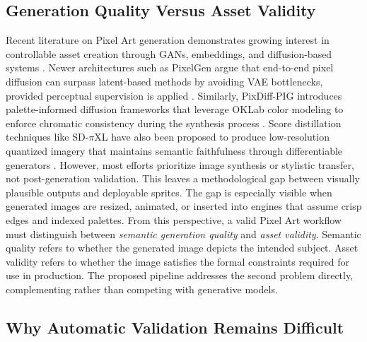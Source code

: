 \documentclass[runningheads]{llncs}
\begin{document}
\subsection{Generation Quality Versus Asset Validity}

Recent literature on Pixel Art generation demonstrates growing interest in controllable asset creation through GANs, embeddings, and diffusion-based systems \cite{coutinho2022,coutinho2024pixel,kim2023game,merino2023five,saravanan2022}. Newer architectures such as PixelGen argue that end-to-end pixel diffusion can surpass latent-based methods by avoiding VAE bottlenecks, provided perceptual supervision is applied \cite{ma2026pixelgen}. Similarly, PixDiff-PIG introduces palette-informed diffusion frameworks that leverage OKLab color modeling to enforce chromatic consistency during the synthesis process \cite{li2025pixdiff}. Score distillation techniques like SD-$\pi$XL have also been proposed to produce low-resolution quantized imagery that maintains semantic faithfulness through differentiable generators \cite{binninger2024sdpixl}. However, most efforts prioritize image synthesis or stylistic transfer, not post-generation validation. This leaves a methodological gap between visually plausible outputs and deployable sprites. The gap is especially visible when generated images are resized, animated, or inserted into engines that assume crisp edges and indexed palettes. From this perspective, a valid Pixel Art workflow must distinguish between \emph{semantic generation quality} and \emph{asset validity}. Semantic quality refers to whether the generated image depicts the intended subject. Asset validity refers to whether the image satisfies the formal constraints required for use in production. The proposed pipeline addresses the second problem directly, complementing rather than competing with generative models.

\subsection{Why Automatic Validation Remains Difficult}
\end{document}
